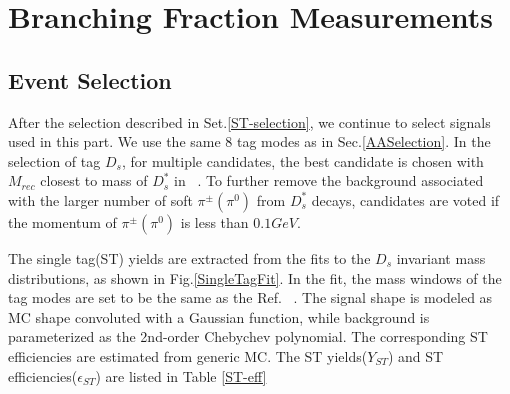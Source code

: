 \section{Branching Fraction Measurements}

\subsection{Event Selection}
\label{BFSelection}
After the selection described in Set.\ref{ST-selection}, we continue to select signals used in this part. 
We use the same 8 tag modes as in Sec.\ref{AASelection}.
In the selection of tag $D_{s}$, for multiple candidates, the best candidate is chosen with $M_{rec}$ closest to mass of $D_{s}^{*}$ in ~\cite{PDG2018}.
To further remove the background associated with the larger number of soft $\pi^{\pm}(\pi^{0})$ from $D_{s}^{*}$ decays, candidates are voted if the momentum of $\pi^{\pm}(\pi^{0})$ is less than $0.1GeV$.

The single tag(ST) yields are extracted from the fits to the $D_{s}$ invariant mass distributions, as shown in Fig.\ref{SingleTagFit}. In the fit, the mass windows of the tag modes are set to be the same as the Ref. ~\cite{Doc-DB-630-v35}.
The signal shape is modeled as MC shape convoluted with a Gaussian function, while background is parameterized as the 2nd-order Chebychev polynomial.
The corresponding ST efficiencies are estimated from generic MC. The ST yields($Y_{ST}$) and ST efficiencies($\epsilon_{ST}$) are listed in Table \ref{ST-eff}

